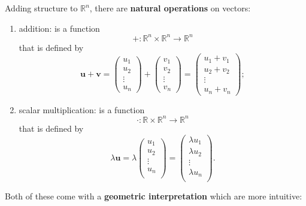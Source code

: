 Adding structure to $\mathbb R^n$, there are \textbf{natural operations} on vectors:

\begin{enumerate}
    \item addition: is a function
    \[+:\mathbb R^n\times\mathbb R^n\to\mathbb R^n\]
    that is defined by
    \[
        \bm u+\bm v=
        \begin{pmatrix}
            u_1\\
            u_2\\
            \vdots\\
            u_n
        \end{pmatrix}
        +
        \begin{pmatrix}
            v_1\\
            v_2\\
            \vdots\\
            v_n
        \end{pmatrix}
        =
        \begin{pmatrix}
            u_1+v_1\\
            u_2+v_2\\
            \vdots\\
            u_n+v_n
        \end{pmatrix}
        ;
    \]
    
    \item scalar multiplication: is a function
    \[\cdot:\mathbb R\times\mathbb R^n\to\mathbb R^n\]
    that is defined by
    \[
        \lambda\bm u=\lambda
        \begin{pmatrix}
            u_1 \\
            u_2 \\
            \vdots \\
            u_n \\
        \end{pmatrix}
        =
        \begin{pmatrix}
            \lambda u_1 \\
            \lambda u_2 \\
            \vdots \\
            \lambda u_n \\
        \end{pmatrix}
        .
    \]
\end{enumerate}

Both of these come with a \textbf{geometric interpretation} which are more intuitive:

